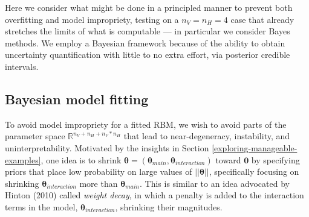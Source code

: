 \documentclass[AMS,STIX1COL]{WileyNJD-v2}
\newcommand{\nv}{{n_{\scriptscriptstyle V}}}
\newcommand{\nh}{{n_{\scriptscriptstyle H}}}
\begin{document}
Here we consider what might be done in a principled manner to prevent
both overfitting and model impropriety, testing on a \(\nv = \nh = 4\)
case that already stretches the limits of what is computable --- in
particular we consider Bayes methods. We employ a Bayesian framework
because of the ability to obtain uncertainty quantification with little
to no extra effort, via posterior credible intervals.

\hypertarget{bayesian-model-fitting}{%
\subsection{Bayesian model fitting}\label{bayesian-model-fitting}}

To avoid model impropriety for a fitted RBM, we wish to avoid parts of
the parameter space \(\mathbb{R}^{\nv + \nh + \nv*\nh}\) that lead to
near-degeneracy, instability, and uninterpretability. Motivated by the
insights in Section \ref{exploring-manageable-examples}, one idea is to
shrink
\(\boldsymbol \theta = (\boldsymbol \theta_{main}, \boldsymbol \theta_{interaction})\)
toward \(\boldsymbol 0\) by specifying priors that place low probability
on large values of \(||\boldsymbol \theta||\), specifically focusing on
shrinking \(\boldsymbol \theta_{interaction}\) more than
\(\boldsymbol \theta_{main}\). This is similar to an idea advocated by
Hinton (2010) called \emph{weight decay}, in which a penalty is added to
the interaction terms in the model,
\(\boldsymbol \theta_{interaction}\), shrinking their magnitudes.

\par
\end{document}
